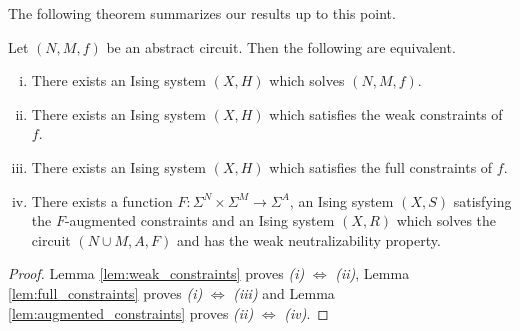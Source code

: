 \documentclass{article}
\begin{document}
\bigskip

The following theorem summarizes our results up to this point.
\begin{thm}\label{thm:ising-solve-equivalences}
  Let $(N, M, f)$ be an abstract circuit. Then the following are equivalent.
  \begin{enumerate}[(i)]
    \item There exists an Ising system $(X, H)$ which solves $(N,M,f)$.
    \item There exists an Ising system $(X,H)$ which satisfies the weak constraints of $f$.
    \item There exists an Ising system $(X,H)$ which satisfies the full constraints of $f$.
    \item There exists a function $F: \Sigma^N \times \Sigma^M\to \Sigma^A$, an Ising system $(X,S)$ satisfying the $F$-augmented constraints and an Ising system $(X, R)$ which solves the circuit $(N\cup M, A, F)$ and has the weak neutralizability property.
  \end{enumerate}
\end{thm}
\begin{proof}
  Lemma \ref{lem:weak_constraints} proves \emph{(i)} $\Leftrightarrow$ \emph{(ii)}, Lemma \ref{lem:full_constraints} proves \emph{(i)} $\Leftrightarrow$ \emph{(iii)} and Lemma \ref{lem:augmented_constraints} proves \emph{(ii)} $\Leftrightarrow$ \emph{(iv)}.
\end{proof}
\end{document}

